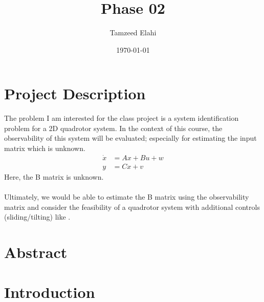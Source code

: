 \documentclass[12pt]{article}
\title{Phase 02}
\author{Tamzeed Elahi}
\date{\today}
\begin{document}
\maketitle

\section*{Project Description}
The problem I am interested for the class project is a system identification problem for a 2D quadrotor system. In the context of this course, the observability of this system will be evaluated; especially for estimating the input matrix which is unknown. 
\begin{align*}
    \dot{x} &= Ax + Bu + w \\
    y &= Cx + v
\end{align*} 
Here, the B matrix is unknown. \\\\
Ultimately, we would be able to estimate the B matrix using the observability matrix and consider the feasibility of a quadrotor system with additional controls (sliding/tilting) like \cite{Nemati2014}. 

\section*{Abstract}



\section*{Introduction}
\end{document}

